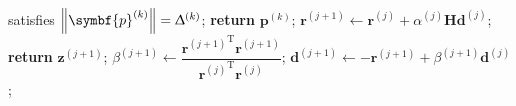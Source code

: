 \begin{algorithm}
\begin{algorithmic}[1]
                        satisfies
                        $\left \lVert \symbf{p}^{(k)} \right \rVert = \trustradius{k}$;
                    \State \textbf{return} $\symbf{p}^{(k)}$;
                \EndIf
                \State $\symbf{r}^{(j+1)} \gets
                    \symbf{r}^{(j)} +
                    \alpha^{(j)}
                    \symbf{H}
                    \symbf{d}^{(j)}$;
                    \State \textbf{return} $\symbf{z}^{(j+1)}$;
                \EndIf
                \State $\beta^{(j+1)} \gets
                    \dfrac{{\symbf{r}^{(j+1)}}^{\mathrm{T}} \symbf{r}^{(j+1)}}{{\symbf{r}^{(j)}}^{\mathrm{T}} \symbf{r}^{(j)}}$;
                \State $\symbf{d}^{(j+1)} \gets -\symbf{r}^{(j+1)} + \beta^{(j+1)} \symbf{d}^{(j)}$;
            \EndFor
        \EndProcedure
    \end{algorithmic}
\end{algorithm}

